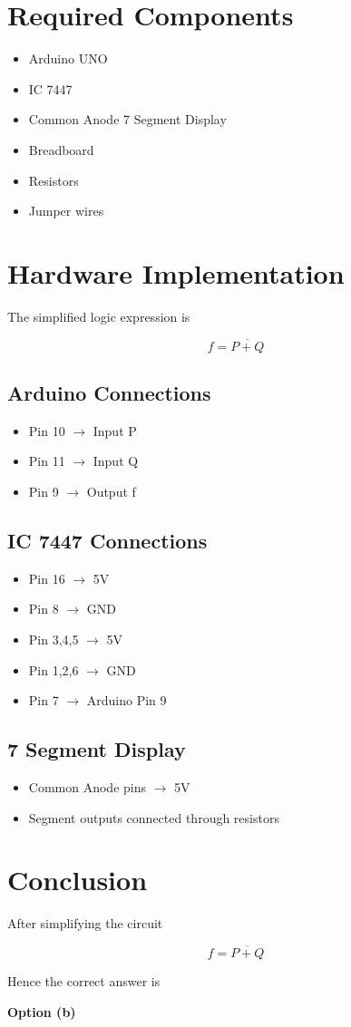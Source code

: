 \documentclass[12pt]{article}
\begin{document}
\section*{Required Components}

\begin{itemize}
\item Arduino UNO
\item IC 7447
\item Common Anode 7 Segment Display
\item Breadboard
\item Resistors
\item Jumper wires
\end{itemize}

\section*{Hardware Implementation}

The simplified logic expression is

\[
f = \overline{P+Q}
\]

\subsection*{Arduino Connections}

\begin{itemize}
\item Pin 10 $\rightarrow$ Input P
\item Pin 11 $\rightarrow$ Input Q
\item Pin 9 $\rightarrow$ Output f
\end{itemize}

\subsection*{IC 7447 Connections}

\begin{itemize}
\item Pin 16 $\rightarrow$ 5V
\item Pin 8 $\rightarrow$ GND
\item Pin 3,4,5 $\rightarrow$ 5V
\item Pin 1,2,6 $\rightarrow$ GND
\item Pin 7 $\rightarrow$ Arduino Pin 9
\end{itemize}

\subsection*{7 Segment Display}

\begin{itemize}
\item Common Anode pins $\rightarrow$ 5V
\item Segment outputs connected through resistors
\end{itemize}

\section*{Conclusion}

After simplifying the circuit

\[
f = \overline{P+Q}
\]

Hence the correct answer is

\textbf{Option (b)}
\end{document}
